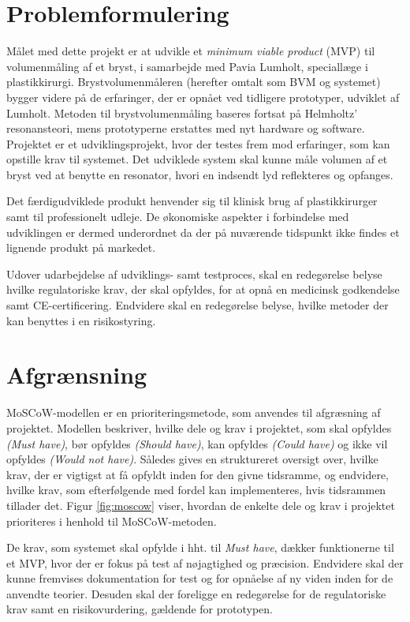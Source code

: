 \section{Problemformulering}
Målet med dette projekt er at udvikle et \textit{minimum viable product} (MVP) til volumenmåling af et bryst, i samarbejde med Pavia Lumholt, speciallæge i plastikkirurgi. Brystvolumenmåleren (herefter omtalt som BVM og systemet) bygger videre på de erfaringer, der er opnået ved tidligere prototyper, udviklet af Lumholt. Metoden til brystvolumenmåling baseres fortsat på Helmholtz' resonansteori, mens prototyperne erstattes med nyt hardware og software. Projektet er et udviklingsprojekt, hvor der testes frem mod erfaringer, som kan opstille krav til systemet. Det udviklede system skal kunne måle volumen af et bryst ved at benytte en resonator, hvori en indsendt lyd reflekteres og opfanges. 

Det færdigudviklede produkt henvender sig til klinisk brug af plastikkirurger samt til professionelt udleje. De økonomiske aspekter i forbindelse med udviklingen er dermed underordnet da der på nuværende tidspunkt ikke findes et lignende produkt på markedet.   

Udover udarbejdelse af udviklings- samt testproces, skal en redegørelse belyse hvilke regulatoriske krav, der skal opfyldes, for at opnå en medicinsk godkendelse samt CE-certificering. Endvidere skal en redegørelse belyse, hvilke metoder der kan benyttes i en risikostyring.

\section{Afgrænsning}
MoSCoW-modellen er en prioriteringsmetode, som anvendes til afgræsning af projektet. Modellen beskriver, hvilke dele og krav i projektet, som skal opfyldes \textit{(Must have)}, bør opfyldes \textit{(Should have)}, kan opfyldes \textit{(Could have)} og ikke vil opfyldes \textit{(Would not have)}. Således gives en struktureret oversigt over, hvilke krav, der er vigtigst at få opfyldt inden for den givne tidsramme, og endvidere, hvilke krav, som efterfølgende med fordel kan implementeres, hvis tidsrammen tillader det. Figur \ref{fig:moscow} viser, hvordan de enkelte dele og krav i projektet prioriteres i henhold til MoSCoW-metoden.

De krav, som systemet skal opfylde i hht. til \textit{Must have}, dækker funktionerne til et MVP, hvor der er fokus på test af nøjagtighed og præcision. Endvidere skal der kunne fremvises dokumentation for test og for opnåelse af ny viden inden for de anvendte teorier. Desuden skal der foreligge en redegørelse for de regulatoriske krav samt en risikovurdering, gældende for prototypen.

